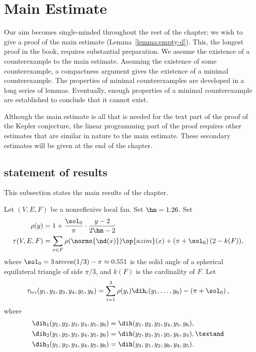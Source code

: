 \section{Main Estimate}\label{sec:weight}  

Our aim becomes single-minded throughout the rest of the chapter; we
wish to give a proof of the main estimate (Lemma~\ref{lemma:empty-d}).
This,  the longest proof in the book,  requires substantial
preparation.  We  assume the existence of a counterexample to the
main estimate.  Assuming the existence of some counterexample, a
compactness argument gives the existence of a minimal counterexample.
The properties of minimal counterexamples are developed in a long
series of lemmas.  Eventually, enough properties of a minimal
counterexample are established to conclude that it cannot exist.

Although the main estimate is all that is needed for the text part of
the proof of the Kepler conjecture, the linear programming part of the
proof requires other estimates that are similar in nature to the
main estimate.  These secondary estimates will be given at the end of the chapter.

\subsection{statement of results}\label{sec:statement}

This subsection states the main results of the chapter.

\begin{definition}\label{def:tau}
Let $(V,E,F)$ be a nonreflexive local fan.  Set $\hm = 1.26$.  Set
\begin{align*}
\rho(y) &= 1 + \dfrac{\sol_0}{\pi} \cdot
    \dfrac{y-2}{2\hm-2} \\
  \tau(V,E,F) &=\sum_{x\in F} \rho(\normo{\nd(x)})\op{azim}(x)
+ \left(\pi+{\sol_0}\right) (2- k(F)),
\end{align*}
where $\sol_0=3\arccos(1/3)-\pi\approx0.551$ is the solid angle of a
spherical equilateral triangle of side $\pi/3$, and $k(F)$ is the
cardinality of $F$.  
Let 
\begin{equation}\label{eqn:tautri}
  \tau_{tri}(y_1,y_2,y_3,y_4,y_5,y_6) =
  \sum_{i=1}^3 \rho(y_i) \dih_i(y_1,\ldots,y_6)
- \left(\pi+{\sol_0}\right),
\end{equation}
where
\begin{align}\label{eqn:dihi}
\dih_1(y_1,y_2,y_3,y_4,y_5,y_6) &= \dih(y_1,y_2,y_3,y_4,y_5,y_6),\notag\\
\dih_2(y_1,y_2,y_3,y_4,y_5,y_6) &= \dih(y_2,y_3,y_1,y_5,y_6,y_4),\textand\notag \\
\dih_3(y_1,y_2,y_3,y_4,y_5,y_6) &= \dih(y_3,y_1,y_2,y_6,y_4,y_5).
\end{align}
\end{definition}


